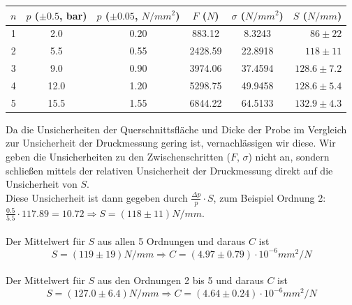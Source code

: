 \documentclass[twoside]{article}
\begin{document}
\begin{table}[H]
\begin{center}
\begin{tabular}{|c|c|c|c|c|r|}
\hline
$n$ & $p$ ($\pm 0.5$, bar) & $p$ ($\pm 0.05$, $\si{N/mm^2}$) & $F$ ($N$) & $\sigma$ ($\si{N/mm^2}$) & $S$ ($\si{N/mm}$)\\
\hline
1 & 2.0 & 0.20 & 883.12 & 8.3243 & $86 \pm 22$\\
2 & 5.5 & 0.55 & 2428.59 & 22.8918 & $118 \pm 11$\\
3 & 9.0 & 0.90 & 3974.06 & 37.4594 & $128.6 \pm 7.2$\\
4 & 12.0 & 1.20 & 5298.75 & 49.9458 & $128.6 \pm 5.4$\\
5 & 15.5 & 1.55 & 6844.22 & 64.5133 & $132.9 \pm 4.3$\\
\hline
\end{tabular}
\end{center}
\end{table}
\vspace{0.5mm}

Da die Unsicherheiten der Querschnittsfläche und Dicke der Probe im Vergleich zur Unsicherheit der Druckmessung gering ist, vernachlässigen wir diese. Wir geben die Unsicherheiten zu den Zwischenschritten ($F$, $\sigma$) nicht an, sondern schließen mittels der relativen Unsicherheit der Druckmessung direkt auf die Unsicherheit von $S$.\\
Diese Unsicherheit ist dann gegeben durch $\frac{\Delta p}{p} \cdot S$, zum Beispiel Ordnung 2: $\frac{0.5}{5.5} \cdot 117.89=10.72 \Rightarrow S=(118 \pm 11) \si{N/mm}$.\\
\\
Der Mittelwert für $S$ aus allen 5 Ordnungen und daraus $C$ ist
$$S=(119 \pm 19)\si{N/mm} \Rightarrow C=(4.97 \pm 0.79) \cdot 10^{-6}\si{mm^2/N}$$
\\
Der Mittelwert für $S$ aus den Ordnungen 2 bis 5 und daraus $C$ ist
$$\boxed{S=(127.0 \pm 6.4)\si{N/mm} \Rightarrow C=(4.64 \pm 0.24) \cdot 10^{-6}\si{mm^2/N}}$$
\end{document}
